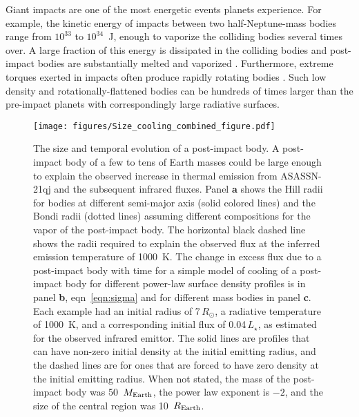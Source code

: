 \documentclass[sn-nature]{sn-jnl}%
\begin{document}
Giant impacts are one of the most energetic events planets experience.
%
For example, the kinetic energy of impacts between two half-Neptune-mass bodies range from $10^{33}$ to $10^{34}$~J, enough to vaporize the colliding bodies several times over.
%
A large fraction of this energy is dissipated in the colliding bodies and post-impact bodies are substantially melted and vaporized \cite{Nakajima2015,Lock2017,Carter2020}.
%
Furthermore, extreme torques exerted in impacts often produce rapidly rotating bodies \cite{Lock2017}.
%
Such low density and rotationally-flattened bodies can be hundreds of times larger than the pre-impact planets \cite{Lock2017} with correspondingly large radiative surfaces.



\begin{figure}
\begin{centering}
\texttt{[image: figures/Size\_cooling\_combined\_figure.pdf]}
\caption{The size and temporal evolution of a post-impact body.
%
A post-impact body of a few to tens of Earth masses could be large enough to explain the observed increase in thermal emission from ASASSN-21qj and the subsequent infrared fluxes.
%
Panel {\bf a} shows the Hill radii for bodies at different semi-major axis (solid colored lines) and the Bondi radii (dotted lines) assuming different compositions for the vapor of the post-impact body.
%
The horizontal black dashed line shows the radii required to explain the observed flux at the inferred emission temperature of 1000~K. 
%
The change in excess flux due to a post-impact body with time for a simple model of cooling of a post-impact body for different power-law surface density profiles is in panel {\bf b}, eqn~\ref{eqn:sigma} and for different mass bodies in panel {\bf c}.
%
Each example had an initial radius of 7\,$R_\odot$, a radiative temperature of 1000~K, and a corresponding initial flux of 0.04\,$L_\star$, as estimated for the observed infrared emittor.
%
The solid lines are profiles that can have non-zero initial density at the initial emitting radius, and the dashed lines are for ones that are forced to have zero density at the initial emitting radius.
%
When not stated, the mass of the post-impact body was 50~$M_{\rm Earth}$, the power law exponent is $-2$, and the size of the central region was 10~$R_{\rm Earth}$.
}
\label{fig:Hill_Bondi_R}

\end{centering}
\end{figure}
\end{document}
